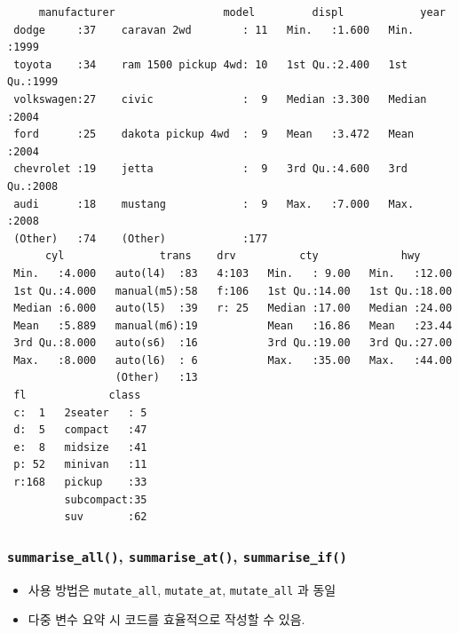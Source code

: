 \documentclass[
  11pt,
]{krantz}
\makeatletter
\providecommand{\tightlist}{%
  \setlength{\itemsep}{0pt}\setlength{\parskip}{0pt}}
\newenvironment{kframe}{%
\medskip{}
\setlength{\fboxsep}{.8em}
 \def\at@end@of@kframe{}%
 \ifinner\ifhmode%
  \def\at@end@of@kframe{\end{minipage}}%
  \begin{minipage}{\columnwidth}%
 \fi\fi%
 \def\FrameCommand##1{\hskip\@totalleftmargin \hskip-\fboxsep
 \colorbox{shadecolor}{##1}\hskip-\fboxsep
     \hskip-\linewidth \hskip-\@totalleftmargin \hskip\columnwidth}%
 \MakeFramed {\advance\hsize-\width
   \@totalleftmargin\z@ \linewidth\hsize
   \@setminipage}}%
 {\par\unskip\endMakeFramed%
 \at@end@of@kframe}
\renewenvironment{quote}{\begin{kframe}}{\end{kframe}}
\makeatother
\begin{document}
\begin{verbatim}
     manufacturer                 model         displ            year     
 dodge     :37    caravan 2wd        : 11   Min.   :1.600   Min.   :1999  
 toyota    :34    ram 1500 pickup 4wd: 10   1st Qu.:2.400   1st Qu.:1999  
 volkswagen:27    civic              :  9   Median :3.300   Median :2004  
 ford      :25    dakota pickup 4wd  :  9   Mean   :3.472   Mean   :2004  
 chevrolet :19    jetta              :  9   3rd Qu.:4.600   3rd Qu.:2008  
 audi      :18    mustang            :  9   Max.   :7.000   Max.   :2008  
 (Other)   :74    (Other)            :177                                 
      cyl               trans    drv          cty             hwy       
 Min.   :4.000   auto(l4)  :83   4:103   Min.   : 9.00   Min.   :12.00  
 1st Qu.:4.000   manual(m5):58   f:106   1st Qu.:14.00   1st Qu.:18.00  
 Median :6.000   auto(l5)  :39   r: 25   Median :17.00   Median :24.00  
 Mean   :5.889   manual(m6):19           Mean   :16.86   Mean   :23.44  
 3rd Qu.:8.000   auto(s6)  :16           3rd Qu.:19.00   3rd Qu.:27.00  
 Max.   :8.000   auto(l6)  : 6           Max.   :35.00   Max.   :44.00  
                 (Other)   :13                                          
 fl             class   
 c:  1   2seater   : 5  
 d:  5   compact   :47  
 e:  8   midsize   :41  
 p: 52   minivan   :11  
 r:168   pickup    :33  
         subcompact:35  
         suv       :62  
\end{verbatim}

\normalsize

\hypertarget{summarise-variant}{%
\subsubsection*{\texorpdfstring{\texttt{summarise\_all()}, \texttt{summarise\_at()}, \texttt{summarise\_if()}}{summarise\_all(), summarise\_at(), summarise\_if()}}\label{summarise-variant}}


\begin{quote}
\begin{itemize}
\tightlist
\item
  사용 방법은 \texttt{mutate\_all}, \texttt{mutate\_at}, \texttt{mutate\_all} 과 동일
\item
  다중 변수 요약 시 코드를 효율적으로 작성할 수 있음.
\end{itemize}
\end{quote}

\footnotesize
\end{document}
